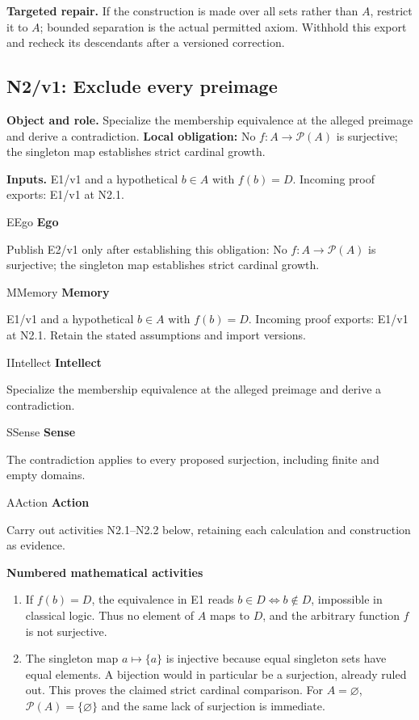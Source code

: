 \documentclass[preprint,12pt,aps,pra,showkeys,amsmath,amssymb,superscriptaddress,floatfix]{revtex4-2}
\theoremstyle{definition}
\theoremstyle{remark}
\newcommand{\mmfaculty}[3]{%
 \begin{mmfacultybox}{#1}{#2}
 {\sffamily\bfseries\color{MMBlue}#2}\par\smallskip #3
 \end{mmfacultybox}}
\newcommand{\field}[2]{\par\smallskip\noindent\textbf{#1.} #2\par}
\begin{document}
\field{Targeted repair}{If the construction is made over all sets rather than \(A\), restrict it
to \(A\); bounded separation is the actual permitted axiom. Withhold
this export and recheck its descendants after a versioned correction.}

\clearpage

\subsection{N2/v1: Exclude every preimage}

\field{Object and role}{Specialize the membership equivalence at the alleged preimage and derive
a contradiction. \textbf{Local obligation:} No \(f:A\to\mathcal P(A)\)
is surjective; the singleton map establishes strict cardinal growth.}

\field{Inputs}{E1/v1 and a hypothetical \(b\in A\) with \(f(b)=D\). Incoming proof
exports: E1/v1 at N2.1.}

\mmfaculty{E}{Ego}{Publish E2/v1 only after establishing this obligation: No
\(f:A\to\mathcal P(A)\) is surjective; the singleton map establishes
strict cardinal growth.}

\mmfaculty{M}{Memory}{E1/v1 and a hypothetical \(b\in A\) with \(f(b)=D\). Incoming proof
exports: E1/v1 at N2.1. Retain the stated assumptions and import
versions.}

\mmfaculty{I}{Intellect}{Specialize the membership equivalence at the alleged preimage and derive
a contradiction.}

\mmfaculty{S}{Sense}{The contradiction applies to every proposed surjection, including finite
and empty domains.}

\mmfaculty{A}{Action}{Carry out activities N2.1--N2.2 below, retaining each calculation and
construction as evidence.}

\smallskip\noindent\textbf{Numbered mathematical activities}

\begin{enumerate}[label=N2.\arabic*,leftmargin=3.4em]

\item If \(f(b)=D\), the equivalence in E1 reads \(b\in D\iff b\notin D\),
impossible in classical logic. Thus no element of \(A\) maps to \(D\),
and the arbitrary function \(f\) is not surjective.

\item The singleton map \(a\mapsto\{a\}\) is injective because equal singleton
sets have equal elements. A bijection would in particular be a
surjection, already ruled out. This proves the claimed strict cardinal
comparison. For \(A=\varnothing\), \(\mathcal P(A)=\{\varnothing\}\) and
the same lack of surjection is immediate.

\end{enumerate}
\end{document}
